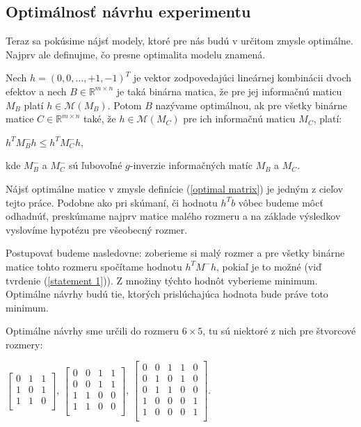 \subsection{Optimálnosť návrhu experimentu}

Teraz sa pokúsime nájsť modely, ktoré pre nás budú v určitom zmysle optimálne. 
Najprv ale definujme, čo presne optimalita modelu znamená.

\begin{defin}
\label{optimal matrix definition}
Nech $h = (0, 0,\ldots , +1, -1)^T$ je vektor zodpovedajúci lineárnej kombinácii dvoch efektov
a nech $B \in \mathbb{R}^{m \times n}$ je taká binárna matica, že pre jej informačnú maticu $M_B$ platí $h \in \mathcal{M}(M_B)$.
Potom $B$ nazývame optimálnou, ak pre všetky binárne matice $C \in \mathbb{R}^{m \times n}$ také,
že $h \in \mathcal{M}(M_C)$ pre ich informačnú maticu $M_C$, platí:

\begin{center}
\label{optimal matrix}
$h^T M_{B}^- h \leq h^T M_{C}^- h$,
\end{center}
kde $M_{B}^-$ a $M_{C}^-$ sú ľubovoľné $g$-inverzie informačných matíc $M_B$ a $M_C$.

\end{defin}

Nájsť optimálne matice v zmysle definície (\ref{optimal matrix}) je jedným z cieľov tejto práce. 
Podobne ako pri skúmaní, či hodnotu $h^T b$ vôbec budeme môcť odhadnúť, 
preskúmame najprv matice malého rozmeru a na základe výsledkov vyslovíme hypotézu pre všeobecný rozmer.

Postupovať budeme nasledovne: zoberieme si malý rozmer a pre všetky binárne matice tohto rozmeru spočítame hodnotu $h^T M^- h$, 
pokiaľ je to možné (viď tvrdenie (\ref{statement 1})). Z množiny týchto hodnôt vyberieme minimum. 
Optimálne návrhy budú tie, ktorých prislúchajúca hodnota bude práve toto minimum.

Optimálne návrhy sme určili do rozmeru $6 \times 5$, tu sú niektoré z nich pre štvorcové rozmery:

\begin{center}
$
\begin{bmatrix}
0 & 1 & 1 \\ 
1 & 0 & 1 \\ 
1 & 1 & 0 \\ 
\end{bmatrix}
$, 
$
\begin{bmatrix}
0 & 0 & 1 & 1 \\
0 & 0 & 1 & 1 \\
1 & 1 & 0 & 0 \\
1 & 1 & 0 & 0 \\
\end{bmatrix}
$, 
$
\begin{bmatrix}
0 & 0 & 1 & 1 & 0 \\
0 & 1 & 0 & 1 & 0 \\
0 & 1 & 1 & 0 & 0 \\
1 & 0 & 0 & 0 & 1 \\
1 & 0 & 0 & 0 & 1 \\
\end{bmatrix}
$.
\end{center}

